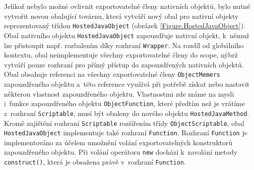 Jelikož nebylo možné ovlivnit exportovatelné členy nativních objektů, bylo nutné vytvořit novou obalující továrnu, která vytváří nový obal pro nativní objekty reprezentovaný třídou \texttt{HostedJavaObject} (obrázek \ref{Figure.HostedJavaObject}). Obal nativního objektu \texttt{HostedJavaObject} zapouzdřuje nativní objekt, k~němuž lze přistoupit např. rozbalením díky rozhraní \texttt{Wrapper}. Na rozdíl od globálního kontextu, obal neimplementuje všechny exportovatelné členy do scope, nýbrž vytváří pouze rozhraní pro přímý přístup do zapouzdřených nativních objektů. Obal obsahuje referenci na všechny exportovatelné členy \texttt{ObjectMemers} zapouzdřeného objektu a~této reference využívá při potřebě získat nebo nastavit některou vlastnost zapouzdřeného objektu. Vlastnostmi zde máme na mysli i~funkce zapouzdřeného objektu \texttt{ObjectFunction}, které předtím než je vrátíme z~rozhraní \texttt{Scriptable}, musí být obaleny do nového objektu \texttt{HostedJavaMethod}. Kromě zajištění rozhraní \texttt{Scriptable} rozšířením třídy \texttt{ObjectScriptable}, obal \texttt{HostedJavaObject} implementuje také rozhraní \texttt{Function}. Rozhraní \texttt{Function} je implementováno za účelem umožnění volání exportovatelných konstruktorů zapouzdřeného objektu. Při volání operátoru \texttt{new} dochází k~zavolání metody \texttt{construct()}, která je obsažena právě v~rozhraní \texttt{Function}.

